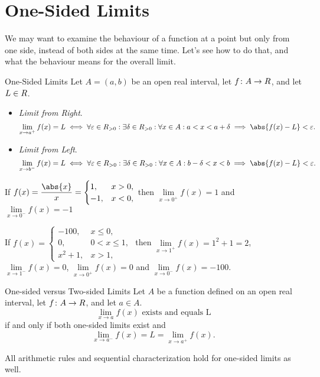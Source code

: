 \section{One-Sided Limits}
We may want to examine the behaviour of a function at a point but only
from one side, instead of both sides at the same time. Let's see how to
do that, and what the behaviour means for the overall limit.
\begin{Definition}{One-Sided Limits}{}
    Let $ A=(a,b) $ be an open real interval, let $ f\colon A\to \relax{R} $, and let $ L\in\relax{R} $.
    \begin{itemize}
        \item \emph{Limit from Right}.
              \[ \lim\limits_{{x} \to {a^+}}f(x)=L\iff
                  \forall \varepsilon\in\R_{>0}:\exists \delta\in\R_{>0}:\forall x\in A: a<x<a+\delta\implies \abs{f(x)-L}<\varepsilon. \]
        \item \emph{Limit from Left}.
              \[ \lim\limits_{{x} \to {b^-}}f(x)=L\iff
                  \forall \varepsilon\in\R_{>0}:\exists \delta\in\R_{>0}:\forall x\in A: b-\delta<x<b\implies \abs{f(x)-L}<\varepsilon. \]
    \end{itemize}
\end{Definition}
\begin{Example}{}{}
    If $ \displaystyle  f(x)=\frac{\abs{x}}{x}=\begin{cases}
            1,  & x>0, \\
            -1, & x<0,
        \end{cases} $ then $\lim\limits_{{x} \to {0^+}}f(x)=1$ and $\lim\limits_{{x} \to {0^-}}f(x)=-1$
\end{Example}
\begin{Example}{}{}
    If $ \displaystyle  f(x)=\begin{cases}
            -100,  & x\le 0,   \\
            0,     & 0<x\le 1, \\
            x^2+1, & x>1,
        \end{cases} $ then $ \lim\limits_{{x} \to {1^+}}f(x)=1^2+1=2 $, $ \lim\limits_{{x} \to {1^-}}f(x)=0 $,
    $ \lim\limits_{{x} \to {0^+}}f(x)=0 $ and $ \lim\limits_{{x} \to {0^-}}f(x)=-100 $.
\end{Example}
\begin{Theorem}{One-sided versus Two-sided Limits}{}
    Let $ A $ be a function defined on an open real interval, let $ f\colon A\to \relax{R} $, and let
    $ a\in A $.
    \[ \text{$\lim\limits_{{x} \to {a}}f(x)$ exists and equals L} \]
    if and only if both one-sided limits exist and
    \[ \lim\limits_{{x} \to {a^-}}f(x) =L=\lim\limits_{{x} \to {a^+}}f(x). \]
\end{Theorem}
\begin{Remark}{}{}
    All arithmetic rules and sequential characterization hold for one-sided limits as well.
\end{Remark}
